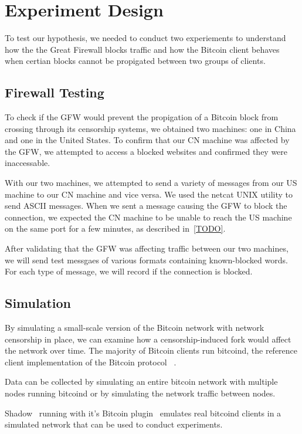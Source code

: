 \section{Experiment Design}

To test our hypothesis, we needed to conduct two experiements to understand how the the Great Firewall blocks traffic and how the Bitcoin client behaves when certian blocks cannot be propigated between two groups of clients.

\subsection{Firewall Testing}
To check if the GFW would prevent the propigation of a Bitcoin block from crossing through its censorship systems, we obtained two machines: one in China and one in the United States. To confirm that our CN machine was affected by the GFW, we attempted to access a blocked websites and confirmed they were inaccessable.

With our two machines, we attempted to send a variety of messages from our US machine to our CN machine and vice versa. We used the netcat UNIX utility to send ASCII messages. When we sent a message causing the GFW to block the connection, we expected the CN machine to be unable to reach the US machine on the same port for a few minutes, as described in~\ref{TODO}.

After validating that the GFW was affecting traffic between our two machines, we will send test messgaes of various formats containing known-blocked words. For each type of message, we will record if the connection is blocked.

\subsection{Simulation}
By simulating a small-scale version of the Bitcoin network with network censorship in place, we can examine how a censorship-induced fork would affect the network over time. The majority of Bitcoin clients run bitcoind, the reference client implementation of the Bitcoin protocol ~\cite{shadow-bitcoin}.

Data can be collected by simulating an entire bitcoin network with multiple nodes running bitcoind or by simulating the network traffic between nodes.

Shadow~\cite{shadow} running with it's Bitcoin plugin~\cite{shadow-bitcoin} emulates real bitcoind clients in a simulated network that can be used to conduct experiments.

